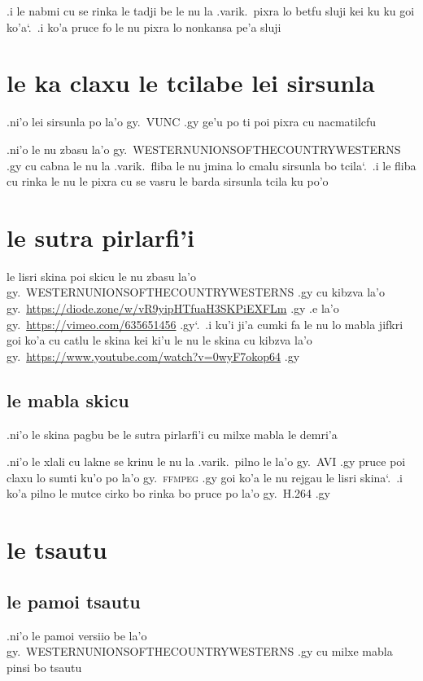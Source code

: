 \documentclass{report}
\newcommand\sds{\spacefactor\sfcode`.\ \space}
\begin{document}
.i le nabmi cu se rinka le tadji be le nu la .varik.\ pixra lo betfu sluji kei ku ku goi ko'a\sds  .i ko'a pruce fo le nu pixra lo nonkansa pe'a sluji

\section{le ka claxu le tcilabe lei sirsunla}
.ni'o lei sirsunla po la'o gy.\ VUNC .gy ge'u po ti poi pixra cu nacmatilcfu

.ni'o le nu zbasu la'o gy.\ WESTERNUNIONSOFTHECOUNTRYWESTERNS .gy cu cabna le nu la .varik.\ fliba le nu jmina lo cmalu sirsunla bo tcila\sds  .i le fliba cu rinka le nu le pixra cu se vasru le barda sirsunla tcila ku po'o

\section{le sutra pirlarfi'i}
le lisri skina poi skicu le nu zbasu la'o gy.\ WESTERNUNIONSOFTHECOUNTRYWESTERNS .gy cu kibzva la'o gy.\ \url{https://diode.zone/w/vR9yipHTfuaH3SKPiEXFLm} .gy .e la'o gy.\ \url{https://vimeo.com/635651456} .gy\sds  .i ku'i ji'a cumki fa le nu lo mabla jifkri goi ko'a cu catlu le skina kei ki'u le nu le skina cu kibzva la'o gy.\ \url{https://www.youtube.com/watch?v=0wyF7okop64} .gy

\subsection{le mabla skicu}
.ni'o le skina pagbu be le sutra pirlarfi'i cu milxe mabla le demri'a

.ni'o le xlali cu lakne se krinu le nu la .varik.\ pilno le la'o gy.\ AVI .gy pruce poi claxu lo sumti ku'o po la'o gy.\ \textsc{ffmpeg} .gy goi ko'a le nu rejgau le lisri skina\sds  .i ko'a pilno le mutce cirko bo rinka bo pruce po la'o gy.\ H.264 .gy

\section{le tsautu}
\subsection{le pamoi tsautu}
.ni'o le pamoi versiio be la'o gy.\ WESTERNUNIONSOFTHECOUNTRYWESTERNS .gy cu milxe mabla pinsi bo tsautu
\end{document}
